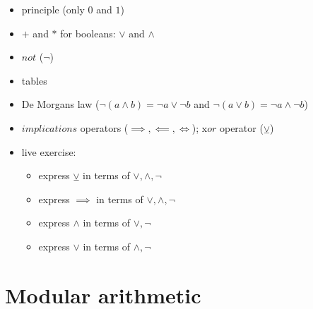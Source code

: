 \documentclass[a4paper,12pt]{article}
\providecommand{\tightlist}{\setlength{\itemsep}{0pt}\setlength{\parskip}{0pt}}
\newcommand{\lxor}{\veebar}
\begin{document}
	\begin{itemize}
	\tightlist
	\item
	principle (only \(0\) and \(1\))
	\item
	\(+\) and \(*\) for booleans: \(\lor\) and \(\land\)
	\item
	\(not\) (\(\lnot\))
	\item
	tables
	\item
	De Morgan\textquotesingle s law
	(\(\lnot (a \land b) = \lnot a \lor \lnot b\) and
	\(\lnot (a \lor b) = \lnot a \land \lnot b\))
	\item
	\(implications\) operators (\(\implies, \impliedby, \iff\));
	\(\text{x}or\) operator (\(\lxor\))
	\item
	live exercise:
	
	\begin{itemize}
		\tightlist
		\item
		express \(\lxor\) in terms of \(\lor, \land, \lnot\)
		\item
		express \(\implies\) in terms of \(\lor, \land, \lnot\)
		\item
		express \(\land\) in terms of \(\lor, \lnot\)
		\item
		express \(\lor\) in terms of \(\land, \lnot\)
	\end{itemize}
	\end{itemize}
	
	
	
	
	
	
	\hypertarget{modular-arithmetic}{%
	\section{Modular arithmetic}\label{modular-arithmetic}}
	
\end{document}
